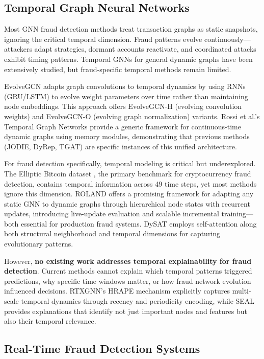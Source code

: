 \subsection{Temporal Graph Neural Networks}

Most GNN fraud detection methods treat transaction graphs as static snapshots, ignoring the critical temporal dimension. Fraud patterns evolve continuously—attackers adapt strategies, dormant accounts reactivate, and coordinated attacks exhibit timing patterns. Temporal GNNs for general dynamic graphs have been extensively studied, but fraud-specific temporal methods remain limited.

EvolveGCN \citep{pareja2020evolvegcn} adapts graph convolutions to temporal dynamics by using RNNs (GRU/LSTM) to evolve weight parameters over time rather than maintaining node embeddings. This approach offers EvolveGCN-H (evolving convolution weights) and EvolveGCN-O (evolving graph normalization) variants. Rossi et al.'s Temporal Graph Networks \citep{rossi2020tgn} provide a generic framework for continuous-time dynamic graphs using memory modules, demonstrating that previous methods (JODIE, DyRep, TGAT) are specific instances of this unified architecture.

For fraud detection specifically, temporal modeling is critical but underexplored. The Elliptic Bitcoin dataset \citep{weber2019anti}, the primary benchmark for cryptocurrency fraud detection, contains temporal information across 49 time steps, yet most methods ignore this dimension. ROLAND \citep{you2022roland} offers a promising framework for adapting any static GNN to dynamic graphs through hierarchical node states with recurrent updates, introducing live-update evaluation and scalable incremental training—both essential for production fraud systems. DySAT \citep{sankar2020dysat} employs self-attention along both structural neighborhood and temporal dimensions for capturing evolutionary patterns.

However, \textbf{no existing work addresses temporal explainability for fraud detection}. Current methods cannot explain which temporal patterns triggered predictions, why specific time windows matter, or how fraud network evolution influenced decisions. RTXGNN's HRAPE mechanism explicitly captures multi-scale temporal dynamics through recency and periodicity encoding, while SEAL provides explanations that identify not just important nodes and features but also their temporal relevance.

\subsection{Real-Time Fraud Detection Systems}

